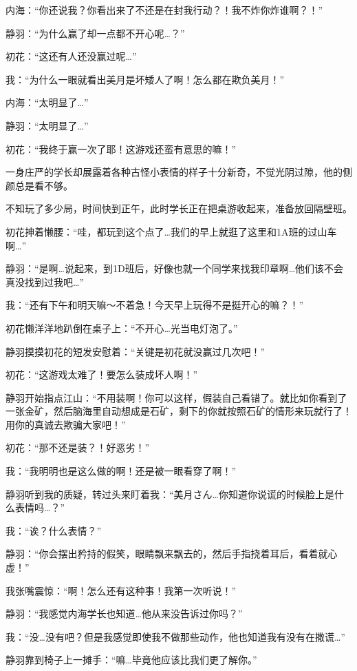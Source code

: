 内海：“你还说我？你看出来了不还是在封我行动？！我不炸你炸谁啊？！”

静羽：“为什么赢了却一点都不开心呢…？”

初花：“这还有人还没赢过呢…”


我：“为什么一眼就看出美月是坏矮人了啊！怎么都在欺负美月！”

内海：“太明显了…”

静羽：“太明显了…”

初花：“我终于赢一次了耶！这游戏还蛮有意思的嘛！”


一身庄严的学长却展露着各种古怪小表情的样子十分新奇，不觉光阴过隙，他的侧颜总是看不够。

不知玩了多少局，时间快到正午，此时学长正在把桌游收起来，准备放回隔壁班。

初花抻着懒腰：“哇，都玩到这个点了…我们的早上就逛了这里和1A班的过山车啊…”

静羽：“是啊…说起来，到1D班后，好像也就一个同学来找我印章啊…他们该不会真没找到过我吧…”

我：“还有下午和明天嘛～不着急！今天早上玩得不是挺开心的嘛？！”

初花懒洋洋地趴倒在桌子上：“不开心…光当电灯泡了。”

静羽摸摸初花的短发安慰着：“关键是初花就没赢过几次吧！”

初花：“这游戏太难了！要怎么装成坏人啊！”

静羽开始指点江山：“不用装啊！你可以这样，假装自己看错了。就比如你看到了一张金矿，然后脑海里自动想成是石矿，剩下的你就按照石矿的情形来玩就行了！用你的真诚去欺骗大家吧！”

初花：“那不还是装？！好恶劣！”

我：“我明明也是这么做的啊！还是被一眼看穿了啊！”

静羽听到我的质疑，转过头来盯着我：“美月さん…你知道你说谎的时候脸上是什么表情吗…？”

我：“诶？什么表情？”

静羽：“你会摆出矜持的假笑，眼睛飘来飘去的，然后手指挠着耳后，看着就心虚！”

我张嘴震惊：“啊！怎么还有这种事！我第一次听说！”

静羽：“我感觉内海学长也知道…他从来没告诉过你吗？”

我：“没…没有吧？但是我感觉即使我不做那些动作，他也知道我有没有在撒谎…”

静羽靠到椅子上一摊手：“嘛…毕竟他应该比我们更了解你。”

